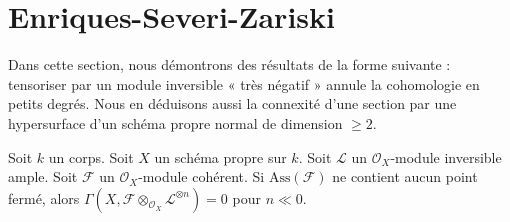 \section{Enriques-Severi-Zariski}
\label{section-vanishing-negative}

\noindent
Dans cette section, nous démontrons des résultats de la forme suivante : tensoriser par
un module inversible « très négatif » annule la cohomologie en
petits degrés. Nous en déduisons aussi la connexité
d'une section par une hypersurface d'un schéma propre normal de
dimension $\geq 2$.

\begin{lemma}
\label{lemma-vanishin-h0-negative}
Soit $k$ un corps. Soit $X$ un schéma propre sur $k$. Soit $\mathcal{L}$
un $\mathcal{O}_X$-module inversible ample. Soit $\mathcal{F}$ un
$\mathcal{O}_X$-module cohérent. Si $\text{Ass}(\mathcal{F})$ ne
contient aucun point fermé, alors
$\Gamma(X, \mathcal{F} \otimes_{\mathcal{O}_X} \mathcal{L}^{\otimes n}) = 0$
pour $n \ll 0$.
\end{lemma}

